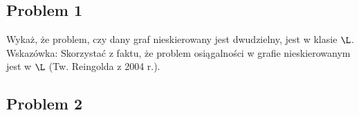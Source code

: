 \subsection{Problem 1}
Wykaż, że problem, czy dany graf nieskierowany jest dwudzielny, jest w klasie $\L$. Wskazówka: Skorzystać z faktu, że problem osiągalności w grafie nieskierowanym jest w $\L$ (Tw. Reingolda z 2004 r.).


\subsection{Problem 2}
